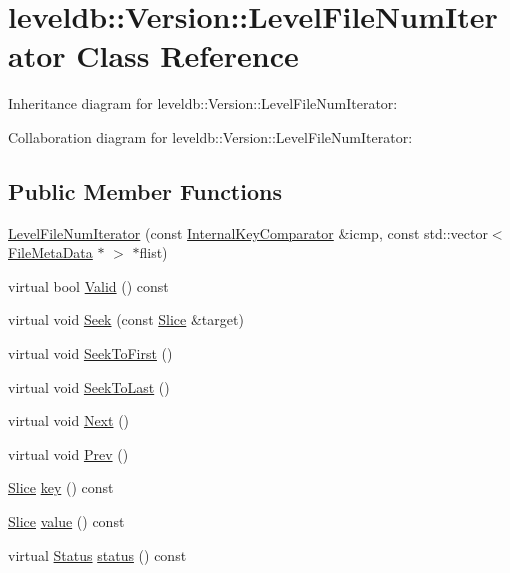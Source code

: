 \hypertarget{classleveldb_1_1_version_1_1_level_file_num_iterator}{\section{leveldb\-:\-:Version\-:\-:Level\-File\-Num\-Iterator Class Reference}
\label{classleveldb_1_1_version_1_1_level_file_num_iterator}
}


Inheritance diagram for leveldb\-:\-:Version\-:\-:Level\-File\-Num\-Iterator\-:


Collaboration diagram for leveldb\-:\-:Version\-:\-:Level\-File\-Num\-Iterator\-:
\subsection*{Public Member Functions}
\begin{DoxyCompactItemize}
\item 
\hyperlink{classleveldb_1_1_version_1_1_level_file_num_iterator_a7d9b5b7c74d74974ae322d20535f112a}{Level\-File\-Num\-Iterator} (const \hyperlink{classleveldb_1_1_internal_key_comparator}{Internal\-Key\-Comparator} \&icmp, const std\-::vector$<$ \hyperlink{structleveldb_1_1_file_meta_data}{File\-Meta\-Data} $\ast$ $>$ $\ast$flist)
\item 
virtual bool \hyperlink{classleveldb_1_1_version_1_1_level_file_num_iterator_afb097a457cd972895393b3fbde7e2ad2}{Valid} () const 
\item 
virtual void \hyperlink{classleveldb_1_1_version_1_1_level_file_num_iterator_adbe855f4a783c2f578e1ff2fbb5259b2}{Seek} (const \hyperlink{classleveldb_1_1_slice}{Slice} \&target)
\item 
virtual void \hyperlink{classleveldb_1_1_version_1_1_level_file_num_iterator_a8e5d34bf0c1e17e83bbb9941821a7ee2}{Seek\-To\-First} ()
\item 
virtual void \hyperlink{classleveldb_1_1_version_1_1_level_file_num_iterator_ac7fafc33c049d1e33fdf9b5ae99f73d8}{Seek\-To\-Last} ()
\item 
virtual void \hyperlink{classleveldb_1_1_version_1_1_level_file_num_iterator_a7f470d4bd4dd27ff653bd1e61ccfd759}{Next} ()
\item 
virtual void \hyperlink{classleveldb_1_1_version_1_1_level_file_num_iterator_ab39c60a98d579590231034fdb665cb42}{Prev} ()
\item 
\hyperlink{classleveldb_1_1_slice}{Slice} \hyperlink{classleveldb_1_1_version_1_1_level_file_num_iterator_a8c2ee5f532fd05b2864f8d69d5c01f45}{key} () const 
\item 
\hyperlink{classleveldb_1_1_slice}{Slice} \hyperlink{classleveldb_1_1_version_1_1_level_file_num_iterator_ac09a8ed595aca29d90e6af91e80a4f00}{value} () const 
\item 
virtual \hyperlink{classleveldb_1_1_status}{Status} \hyperlink{classleveldb_1_1_version_1_1_level_file_num_iterator_a98bae41a244b6a5a6675a7f7b322281d}{status} () const 
\end{DoxyCompactItemize}
